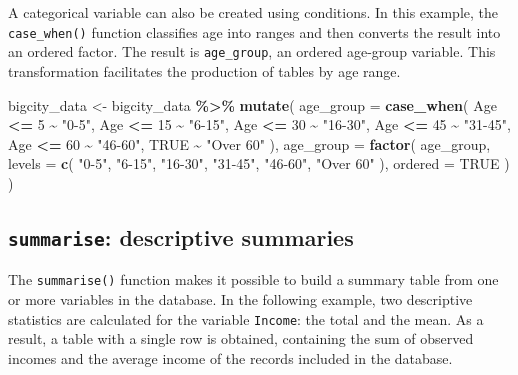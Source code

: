 \documentclass[
  english,
  12pt,
]{book}
\newenvironment{Shaded}{\begin{snugshade}}{\end{snugshade}}
\newcommand{\AttributeTok}[1]{\textcolor[rgb]{0.13,0.29,0.53}{#1}}
\newcommand{\ConstantTok}[1]{\textcolor[rgb]{0.56,0.35,0.01}{#1}}
\newcommand{\DecValTok}[1]{\textcolor[rgb]{0.00,0.00,0.81}{#1}}
\newcommand{\FunctionTok}[1]{\textcolor[rgb]{0.13,0.29,0.53}{\textbf{#1}}}
\newcommand{\NormalTok}[1]{#1}
\newcommand{\OtherTok}[1]{\textcolor[rgb]{0.56,0.35,0.01}{#1}}
\newcommand{\SpecialCharTok}[1]{\textcolor[rgb]{0.81,0.36,0.00}{\textbf{#1}}}
\newcommand{\StringTok}[1]{\textcolor[rgb]{0.31,0.60,0.02}{#1}}
\begin{document}
A categorical variable can also be created using conditions. In this example, the \texttt{case\_when()} function classifies age into ranges and then converts the result into an ordered factor. The result is \texttt{age\_group}, an ordered age-group variable. This transformation facilitates the production of tables by age range.

\begin{Shaded}
\begin{Highlighting}[]
\NormalTok{bigcity\_data }\OtherTok{\textless{}{-}}\NormalTok{ bigcity\_data }\SpecialCharTok{\%\textgreater{}\%}
  \FunctionTok{mutate}\NormalTok{(}
    \AttributeTok{age\_group =} \FunctionTok{case\_when}\NormalTok{(}
\NormalTok{      Age }\SpecialCharTok{\textless{}=} \DecValTok{5} \SpecialCharTok{\textasciitilde{}} \StringTok{"0{-}5"}\NormalTok{,}
\NormalTok{      Age }\SpecialCharTok{\textless{}=} \DecValTok{15} \SpecialCharTok{\textasciitilde{}} \StringTok{"6{-}15"}\NormalTok{,}
\NormalTok{      Age }\SpecialCharTok{\textless{}=} \DecValTok{30} \SpecialCharTok{\textasciitilde{}} \StringTok{"16{-}30"}\NormalTok{,}
\NormalTok{      Age }\SpecialCharTok{\textless{}=} \DecValTok{45} \SpecialCharTok{\textasciitilde{}} \StringTok{"31{-}45"}\NormalTok{,}
\NormalTok{      Age }\SpecialCharTok{\textless{}=} \DecValTok{60} \SpecialCharTok{\textasciitilde{}} \StringTok{"46{-}60"}\NormalTok{,}
      \ConstantTok{TRUE} \SpecialCharTok{\textasciitilde{}} \StringTok{"Over 60"}
\NormalTok{    ),}
    \AttributeTok{age\_group =} \FunctionTok{factor}\NormalTok{(}
\NormalTok{      age\_group,}
      \AttributeTok{levels =} \FunctionTok{c}\NormalTok{(}
        \StringTok{"0{-}5"}\NormalTok{, }\StringTok{"6{-}15"}\NormalTok{, }\StringTok{"16{-}30"}\NormalTok{,}
        \StringTok{"31{-}45"}\NormalTok{, }\StringTok{"46{-}60"}\NormalTok{, }\StringTok{"Over 60"}
\NormalTok{      ),}
      \AttributeTok{ordered =} \ConstantTok{TRUE}
\NormalTok{    )}
\NormalTok{  )}
\end{Highlighting}
\end{Shaded}

\subsection{\texorpdfstring{\texttt{summarise}: descriptive summaries}{summarise: descriptive summaries}}\label{summarise-resumenes-descriptivos}

The \texttt{summarise()} function makes it possible to build a summary table from one or more variables in the database. In the following example, two descriptive statistics are calculated for the variable \texttt{Income}: the total and the mean. As a result, a table with a single row is obtained, containing the sum of observed incomes and the average income of the records included in the database.
\end{document}
